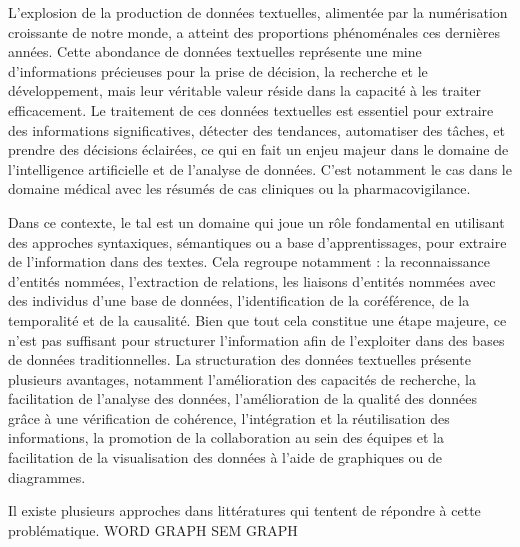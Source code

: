L'explosion de la production de données textuelles, alimentée par la numérisation croissante de notre monde, a atteint des proportions phénoménales ces dernières années.
Cette abondance de données textuelles représente une mine d'informations précieuses pour la prise de décision, la recherche et le développement, mais leur véritable valeur réside dans la capacité à les traiter efficacement.
Le traitement de ces données textuelles est essentiel pour extraire des informations significatives, détecter des tendances, automatiser des tâches, et prendre des décisions éclairées, ce qui en fait un enjeu majeur dans le domaine de l'intelligence artificielle et de l'analyse de données.
C'est notamment le cas dans le domaine médical avec les résumés de cas cliniques ou la pharmacovigilance.

Dans ce contexte, le \gls{tal} est un domaine qui joue un rôle fondamental en utilisant des approches syntaxiques, sémantiques ou a base d'apprentissages, pour extraire de l'information dans des textes.
Cela regroupe notamment : la reconnaissance d'entités nommées, l'extraction de relations, les liaisons d'entités nommées avec des individus d'une base de données, l'identification de la coréférence, de la temporalité et de la causalité.
Bien que tout cela constitue une étape majeure, ce n'est pas suffisant pour structurer l'information afin de l'exploiter dans des bases de données traditionnelles.
La structuration des données textuelles présente plusieurs avantages, notamment l'amélioration des capacités de recherche, la facilitation de l'analyse des données, l'amélioration de la qualité des données grâce à une vérification de cohérence, l'intégration et la réutilisation des informations, la promotion de la collaboration au sein des équipes et la facilitation de la visualisation des données à l'aide de graphiques ou de diagrammes.

Il existe plusieurs approches dans littératures qui tentent de répondre à cette problématique.
WORD GRAPH
SEM GRAPH
